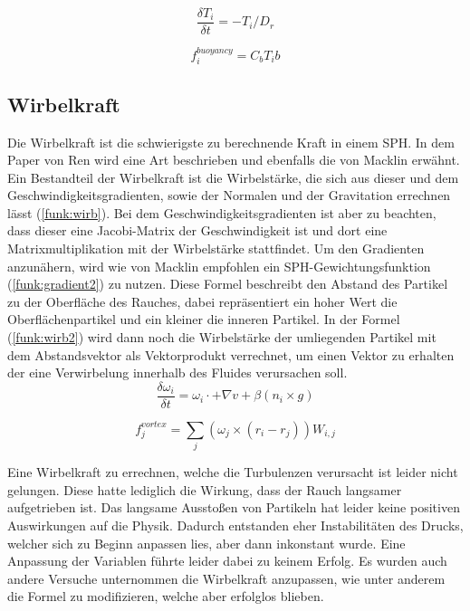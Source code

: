 \documentclass[intern,palatino]{cgBA}
\begin{document}
\begin{equation}\label{funk:temp2}
\frac{\delta T_i}{\delta t}  = - T_i/D_r
\end{equation}

\begin{equation}\label{funk:temp3}
f^{buoyancy}_i  = C_b T_i b
\end{equation}


\subsection{Wirbelkraft}\label{wirbel}

Die Wirbelkraft ist die schwierigste zu berechnende Kraft in einem SPH. In dem Paper von Ren \cite{ren2016fast} wird eine Art beschrieben und ebenfalls die von Macklin \cite{macklin2014unified} erwähnt.
\newline
Ein Bestandteil der Wirbelkraft ist die Wirbelstärke, die sich aus dieser und dem Geschwindigkeitsgradienten, sowie der Normalen und der Gravitation errechnen lässt (\ref{funk:wirb}). Bei dem Geschwindigkeitsgradienten ist aber zu beachten, dass dieser eine Jacobi-Matrix der Geschwindigkeit ist und dort eine Matrixmultiplikation mit der Wirbelstärke stattfindet. Um den Gradienten anzunähern, wird wie von Macklin \cite{macklin2014unified} empfohlen ein SPH-Gewichtungsfunktion (\ref{funk:gradient2}) zu nutzen. Diese Formel beschreibt den Abstand des Partikel zu der Oberfläche des Rauches, dabei repräsentiert ein hoher Wert die Oberflächenpartikel und ein kleiner die inneren Partikel.
In der Formel (\ref{funk:wirb2}) wird dann noch die Wirbelstärke der umliegenden Partikel mit dem Abstandsvektor als Vektorprodukt verrechnet, um einen Vektor zu erhalten der eine Verwirbelung innerhalb des Fluides verursachen soll.  
\begin{equation}\label{funk:wirb}
\frac{\delta \omega_i}{\delta t}  = \omega_i \cdot + \nabla v + \beta(n_i \times g)
\end{equation}

\begin{equation}\label{funk:wirb2}
f^{vortex}_j  = \sum_j (\omega_j \times (r_i -r_j)) W_{i,j}
\end{equation}

Eine Wirbelkraft zu errechnen, welche die Turbulenzen verursacht ist leider nicht gelungen. Diese hatte lediglich die Wirkung, dass der Rauch langsamer aufgetrieben ist. Das langsame Ausstoßen von Partikeln hat leider keine positiven Auswirkungen auf die Physik. Dadurch entstanden eher Instabilitäten des Drucks, welcher sich zu Beginn anpassen lies, aber dann inkonstant wurde. Eine Anpassung der Variablen führte leider dabei zu keinem Erfolg. Es wurden auch andere Versuche unternommen die Wirbelkraft anzupassen, wie unter anderem die Formel zu modifizieren, welche aber erfolglos blieben.
\end{document}
